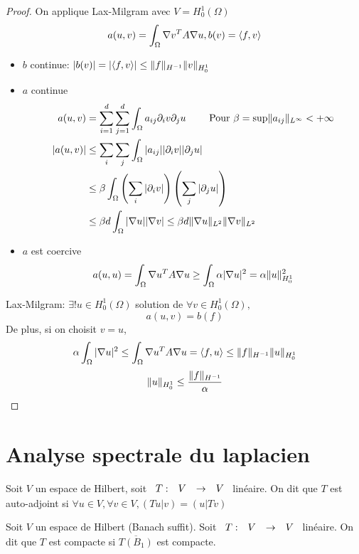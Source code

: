 \documentclass[]{report}
\begin{document}
    \begin{proof}
        On applique Lax-Milgram avec $V=H_0^1(\Omega)$
        \[a(u,v)=\int_\Omega \nabla v^T A\nabla u, b(v)=\langle f,v \rangle\]
        \begin{itemize}
            \item $b$ continue: $|b(v)|=|\langle f,v \rangle|\le \lVert f \rVert_{H^{-1}} \lVert v \rVert_{H_0^1}$
            \item $a$ continue
            \begin{align*}
                a(u,v)&=\sum_{i=1}^{d}\sum_{j=1}^{d} \int_{\Omega} a_{ij}\partial_i v\partial_j u \qquad \text{ Pour $\beta=\sup \lVert a_{ij} \rVert_{L^\infty}<+\infty$}\\
                |a(u,v)|&\le \sum_i \sum_j \int_\Omega |a_{ij}||\partial_i v||\partial_j u|\\
                &\le \beta \int_{\Omega} \left(\sum_i |\partial_i v|\right)\left(\sum_j |\partial_j u|\right)\\
                &\le \beta d \int_\Omega |\nabla u||\nabla v|\le \beta d \lVert \nabla u \rVert_{L^2} \lVert \nabla v \rVert_{L^2}
            \end{align*}
            \item $a$ est coercive
            \[a(u,u)=\int_\Omega\nabla u^T A\nabla u \ge \int_{\Omega} \alpha |\nabla u|^2=\alpha \lVert u \rVert_{H_0^1}^2\]
        \end{itemize}
        Lax-Milgram: $\exists! u\in H_0^1(\Omega)$ solution de $\forall v\in H_0^1(\Omega),$
        \[a(u,v)=b(f)\]
        De plus, si on choisit $v=u$,
        \[\alpha \int_{\Omega}|\nabla u|^2\le \int_{\Omega}\nabla u^T A\nabla u=\langle f,u \rangle\le \lVert f \rVert_{H^{-1}}\lVert u \rVert_{H_0^1}\]
        \[\lVert u \rVert_{H_0^1}\le \frac{\lVert f \rVert_{H^{-1}}}{\alpha}\]
    \end{proof}

    \section{Analyse spectrale du laplacien}

    \begin{df}{}{}
        Soit $V$ un espace de Hilbert, soit $\begin{array}{ccccc} T : & V & \to & V \end{array}$ linéaire. On dit que $T$ est auto-adjoint si $\forall u\in V,\forall v\in V, (Tu|v)=(u|Tv)$
    \end{df}

    \begin{df}{}{}
        Soit $V$ un espace de Hilbert (Banach suffit). Soit $\begin{array}{ccccc} T : & V & \to & V \end{array}$ linéaire. On dit que $T$ est compacte si $\overline{T(B_1)}$ est compacte.
    \end{df}
\end{document}
